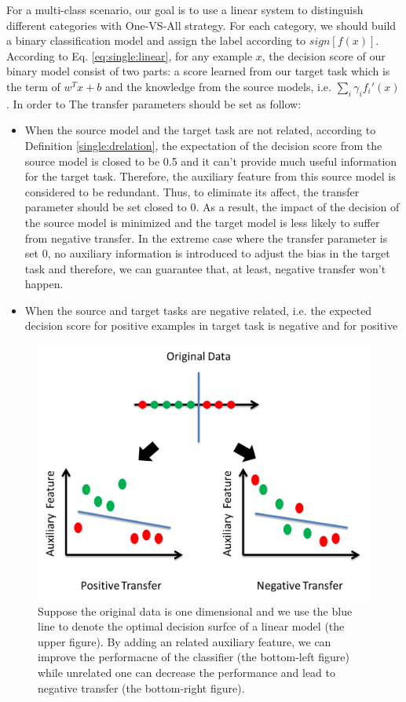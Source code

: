 For a multi-class scenario, our goal is to use a linear system to distinguish different categories with One-VS-All strategy. For each category, we should build a binary classification model and assign the label according to $sign\left[f(x)\right]$. According to Eq. \eqref{eq:single:linear}, for any example $x$, the decision score of our binary model consist of two parts: a score learned from our target task which is the term of $w^Tx+b$ and the knowledge from the source models, i.e. $\sum_{i}\gamma_i f_i'(x)$. In order to
The transfer parameters should be set as follow:
\begin{itemize}
	\item When the source model and the target task are not related, according to Definition \ref{single:drelation}, the expectation of the decision score from the source model is closed to be 0.5 and it can't provide much useful information for the target task. Therefore, the auxiliary feature from this source model is considered to be redundant. Thus, to eliminate its affect, the transfer parameter should be set closed to 0. As a result, the impact of the decision of the source model is minimized and the target model is less likely to suffer from negative transfer. In the extreme case where the transfer parameter is set 0, no auxiliary information is introduced to adjust the bias in the target task and therefore, we can guarantee that, at least, negative transfer won't happen.
	\item When the source and target tasks are negative related, i.e. the expected decision score for positive examples in target task is negative and for positive 
\end{itemize}

\begin{figure}
	\centering
	\includegraphics[scale=.7]{transfer/fig/dataarg.png}
	\caption{Suppose the original data is one dimensional and we use the blue line to denote the optimal decision surfce of a linear model (the upper figure). By adding an related auxiliary feature, we can improve the performacne of the classifier (the bottom-left figure) while unrelated one can decrease the performance and lead to negative transfer (the bottom-right figure). }\label{fig:single:dataarg}
\end{figure}

